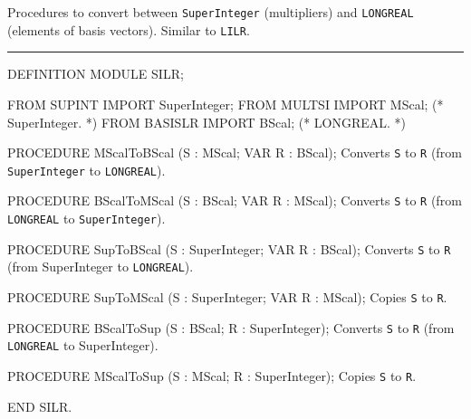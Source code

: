 
Procedures to convert between {\tt SuperInteger} (multipliers) and
{\tt LONGREAL} (elements of basis vectors).
Similar to {\tt LILR}.

\bigskip\hrule
\code

DEFINITION MODULE SILR;

FROM SUPINT  IMPORT SuperInteger;
FROM MULTSI  IMPORT MScal;             (* SuperInteger.                   *)
FROM BASISLR IMPORT BScal;             (* LONGREAL.                       *)

PROCEDURE MScalToBScal (S : MScal;   VAR R : BScal);
\endcode
  \tab  Converts {\tt S} to {\tt R}
   (from {\tt SuperInteger} to {\tt LONGREAL}).\endtab
\code

PROCEDURE BScalToMScal (S : BScal;   VAR R : MScal);
\endcode
  \tab  Converts {\tt S} to {\tt R}
   (from {\tt LONGREAL} to {\tt SuperInteger}).\endtab
\code

PROCEDURE SupToBScal (S : SuperInteger;   VAR R : BScal);
\endcode
  \tab Converts {\tt S} to {\tt R}
   (from SuperInteger to {\tt LONGREAL}).\endtab
\code

PROCEDURE SupToMScal (S : SuperInteger;   VAR R : MScal);
\endcode
  \tab Copies {\tt S} to {\tt R}.\endtab
\code

PROCEDURE BScalToSup (S : BScal;   R : SuperInteger);
\endcode
  \tab Converts {\tt S} to {\tt R}
   (from {\tt LONGREAL} to SuperInteger).\endtab
\code

PROCEDURE MScalToSup (S : MScal;   R : SuperInteger);
\endcode
  \tab Copies {\tt S} to {\tt R}.\endtab
\code

END SILR.
\endcode
